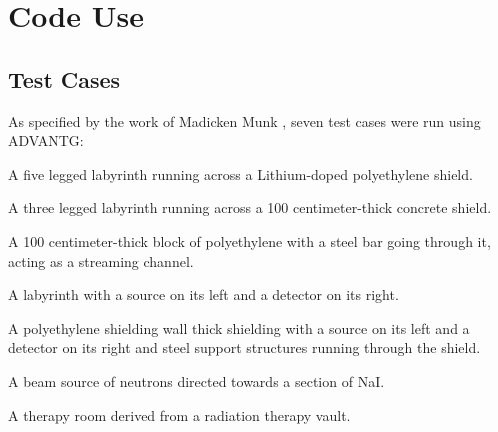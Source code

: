\documentclass[10pt]{article}
\begin{document}





\section{Code Use}
\label{sec:code}





\subsection{Test Cases}
\label{sec:code:tests}

As specified by the work of Madicken Munk \cite{munk:git}, seven test cases were run using ADVANTG:

\begin{outline}[enumerate]
\1 A five legged labyrinth running across a Lithium-doped polyethylene shield.

\1 A three legged labyrinth running across a 100 centimeter-thick concrete shield.

\1 A 100 centimeter-thick block of polyethylene with a steel bar going through it, acting as a streaming channel.

\1 A labyrinth with a source on its left and a detector on its right.

\1 A polyethylene shielding wall thick shielding with a source on its left and a detector on its right and steel support structures running through the shield.

\1 A beam source of neutrons directed towards a section of NaI.

\1 A therapy room derived from a radiation therapy vault.
\end{outline}
\end{document}
